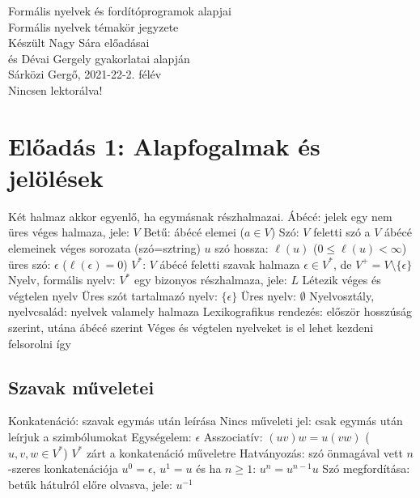 \documentclass[12pt,a4paper]{article}
\begin{document}
\begin{center}
	\huge
	Formális nyelvek és fordítóprogramok alapjai\\
	\vspace{1mm}
	\LARGE
	Formális nyelvek témakör jegyzete\\
	\vspace{5mm}
	\large
	Készült Nagy Sára előadásai\\
	és Dévai Gergely gyakorlatai alapján\\
	\vspace{5mm}
	Sárközi Gergő, 2021-22-2. félév\\
	Nincsen lektorálva!
\end{center}

\tableofcontents

\pagebreak

\section{Előadás 1: Alapfogalmak és jelölések}

\begin{outline}
	\1 Két halmaz akkor egyenlő, ha egymásnak részhalmazai.
	\1 Ábécé: jelek egy nem üres véges halmaza, jele: $V$
	\1 Betű: ábécé elemei ($a \in V$)
	\1 Szó: $V$ feletti szó a $V$ ábécé elemeinek véges sorozata (szó=sztring)
		\2 $u$ szó hossza: $\ell(u)$ \; ($0 \le \ell(u) < \infty$)
		\2 üres szó: $\epsilon$ \; ($\ell(\epsilon) = 0$)
	\1 $V^*$: $V$ ábécé feletti szavak halmaza
		\2 $\epsilon \in V^*$, de $V^+ = V \setminus \{\epsilon\}$
	\1 Nyelv, formális nyelv: $V^*$ egy bizonyos részhalmaza, jele: $L$
		\2 Létezik véges és végtelen nyelv
		\2 Üres szót tartalmazó nyelv: $\{\epsilon\}$
		\2 Üres nyelv: $\emptyset$
	\1 Nyelvosztály, nyelvcsalád: nyelvek valamely halmaza
	\1 Lexikografikus rendezés: először hosszúság szerint, utána ábécé szerint
		\2 Véges és végtelen nyelveket is el lehet kezdeni felsorolni így
\end{outline}

\subsection{Szavak műveletei}

\begin{outline}
	\1 Konkatenáció: szavak egymás után leírása
		\2 Nincs műveleti jel: csak egymás után leírjuk a szimbólumokat
		\2 Egységelem: $\epsilon$
		\2 Asszociatív: $(uv)w=u(vw)$ \; ($u,v,w \in V^*$)
		\2 $V^*$ zárt a konkatenáció műveletre
	\1 Hatványozás: szó önmagával vett $n$-szeres konkatenációja
		\2 $u^0=\epsilon$, $u^1=u$ és ha $n \ge 1$: $u^n=u^{n-1}u$
	\1 Szó megfordítása: betűk hátulról előre olvasva, jele: $u^{-1}$
\end{outline}
\end{document}
